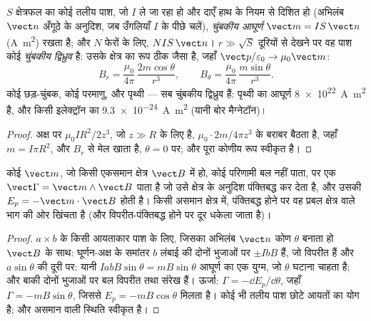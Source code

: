 \begin{definition}[चुंबकीय आघूर्ण]\label{def:b1:magnetostatics:moment}
$S$ क्षेत्रफल का कोई तलीय पाश, जो $I$ ले जा रहा हो और दाएँ हाथ के नियम से
दिशित हो (अभिलंब $\vect n$ अँगूठे के अनुदिश, जब उँगलियाँ $I$ के पीछे चलें),
\emph{चुंबकीय आघूर्ण} $\vect m = IS\,\vect n$ (\unit{A.m^2}) रखता है; और $N$
फेरों के लिए, $NIS\,\vect n$। $r \gg \sqrt S$ दूरियों से देखने पर वह पाश कोई
\emph{चुंबकीय द्विध्रुव} है: उसके क्षेत्र का रूप ठीक  जैसा
है, जहाँ $\vect p/\varepsilon_0 \to \mu_0\vect m$:
\[
B_r = \frac{\mu_0}{4\pi}\,\frac{2m\cos\theta}{r^3}, \qquad
B_\theta = \frac{\mu_0}{4\pi}\,\frac{m\sin\theta}{r^3} .
\]
कोई छड़-चुंबक, कोई परमाणु, और पृथ्वी --- सब चुंबकीय द्विध्रुव हैं: पृथ्वी का
आघूर्ण \qty{8e22}{A.m^2} है, और किसी इलेक्ट्रॉन का \qty{9.3e-24}{A.m^2} (यानी
बोर मैग्नेटॉन)।
\end{definition}

\begin{proof}
अक्ष पर  $\mu_0IR^2/2z^3$, जो $z \gg R$ के लिए है,
$\mu_0 \cdot 2m/4\pi z^3$ के बराबर बैठता है, जहाँ $m = I\pi R^2$, और $B_r$ से
मेल खाता है, $\theta = 0$ पर;
और पूरा कोणीय रूप स्वीकृत है।
\end{proof}

\begin{theorem}[किसी क्षेत्र में द्विध्रुव]\label{thm:b1:magnetostatics:dipoleinfield}
कोई  $\vect m$, जो किसी एकसमान क्षेत्र $\vect B$ में हो, कोई
परिणामी बल नहीं पाता, पर एक  $\vect\Gamma = \vect m\wedge\vect B$
पाता है जो उसे क्षेत्र के अनुदिश पंक्तिबद्ध कर देता है, और उसकी  $E_p = -\vect m\cdot\vect B$ होती है। किसी असमान क्षेत्र में,
पंक्तिबद्ध होने पर वह प्रबल क्षेत्र वाले भाग की ओर खिंचता है (और
विपरीत-पंक्तिबद्ध होने पर दूर धकेला जाता है)।
\end{theorem}

\begin{proof}
$a \times b$ के किसी आयताकार पाश के लिए, जिसका अभिलंब $\vect n$ कोण
$\theta$ बनाता हो $\vect B$ के साथ: घूर्णन-अक्ष के समांतर $b$ लंबाई की दोनों
भुजाओं पर  $\pm IbB$ हैं, जो विपरीत हैं और $a\sin\theta$ की दूरी
पर: यानी $IabB\sin\theta = mB\sin\theta$ आघूर्ण का एक युग्म, जो
$\theta$ घटाना चाहता है; और बाकी दोनों भुजाओं पर बल विपरीत तथा संरेख हैं।
ऊर्जा: $\Gamma = -\dd E_p/\dd\theta$, जहाँ $\Gamma = -mB\sin\theta$, जिससे
$E_p = -mB\cos\theta$ मिलता है। कोई भी तलीय पाश छोटे आयतों का योग है;
और असमान वाली स्थिति स्वीकृत है।
\end{proof}

